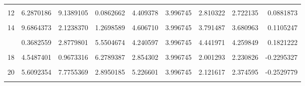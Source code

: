 \documentclass[]{tufte-handout}
\begin{document}
\begin{table}
{\begin{tabular}[t]{rrrrrrrrr}
\addlinespace
\cellcolor{gray!6}{11} & \cellcolor{gray!6}{4.3994310} & \cellcolor{gray!6}{7.0916869} & \cellcolor{gray!6}{3.1375773} & \cellcolor{gray!6}{3.809455} & \cellcolor{gray!6}{3.996745} & \cellcolor{gray!6}{2.191099} & \cellcolor{gray!6}{2.106162} & \cellcolor{gray!6}{0.0849376}\\
12 & 6.2870186 & 9.1389105 & 0.0862662 & 4.409378 & 3.996745 & 2.810322 & 2.722135 & 0.0881873\\
\cellcolor{gray!6}{13} & \cellcolor{gray!6}{6.8602403} & \cellcolor{gray!6}{10.4291384} & \cellcolor{gray!6}{9.6602453} & \cellcolor{gray!6}{4.463471} & \cellcolor{gray!6}{3.996745} & \cellcolor{gray!6}{3.401384} & \cellcolor{gray!6}{3.289852} & \cellcolor{gray!6}{0.1115316}\\
14 & 9.6864373 & 2.1238370 & 1.2698589 & 4.606710 & 3.996745 & 3.791487 & 3.680963 & 0.1105247\\
\cellcolor{gray!6}{15} & \cellcolor{gray!6}{6.3649314} & \cellcolor{gray!6}{0.9749754} & \cellcolor{gray!6}{3.4152821} & \cellcolor{gray!6}{4.939895} & \cellcolor{gray!6}{3.996745} & \cellcolor{gray!6}{2.568665} & \cellcolor{gray!6}{2.633958} & \cellcolor{gray!6}{-0.0652933}\\
\addlinespace
16 & 0.3682559 & 2.8779801 & 5.5504674 & 4.240597 & 3.996745 & 4.441971 & 4.259849 & 0.1821222\\
\cellcolor{gray!6}{17} & \cellcolor{gray!6}{5.8434016} & \cellcolor{gray!6}{5.2180801} & \cellcolor{gray!6}{1.6120696} & \cellcolor{gray!6}{4.306186} & \cellcolor{gray!6}{3.996745} & \cellcolor{gray!6}{2.870485} & \cellcolor{gray!6}{2.765646} & \cellcolor{gray!6}{0.1048390}\\
18 & 4.5487401 & 0.9673316 & 6.2789387 & 2.854302 & 3.996745 & 2.001293 & 2.230826 & -0.2295327\\
\cellcolor{gray!6}{19} & \cellcolor{gray!6}{3.6510340} & \cellcolor{gray!6}{5.0247488} & \cellcolor{gray!6}{2.7621445} & \cellcolor{gray!6}{3.788562} & \cellcolor{gray!6}{3.996745} & \cellcolor{gray!6}{1.957817} & \cellcolor{gray!6}{1.885993} & \cellcolor{gray!6}{0.0718247}\\
20 & 5.6092354 & 7.7755369 & 2.8950185 & 5.226601 & 3.996745 & 2.121617 & 2.374595 & -0.2529779\\
\addlinespace
\cellcolor{gray!6}{21} & \cellcolor{gray!6}{6.2705511} & \cellcolor{gray!6}{8.0279919} & \cellcolor{gray!6}{0.4769332} & \cellcolor{gray!6}{4.696590} & \cellcolor{gray!6}{3.996745} & \cellcolor{gray!6}{3.965896} & \cellcolor{gray!6}{3.861013} & \cellcolor{gray!6}{0.1048832}\\

\end{tabular}}
\end{table}
\end{document}
